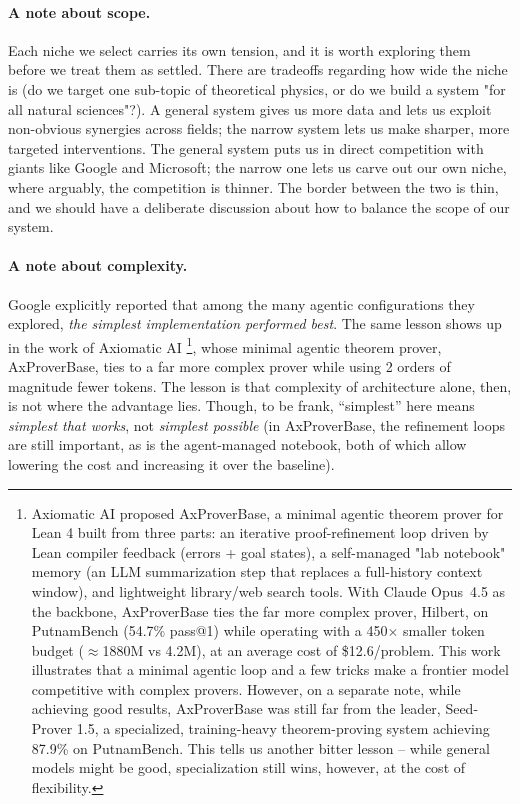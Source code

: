 \paragraph{A note about scope.}
Each niche we select carries its own tension, and it is worth exploring them before we treat them as settled. There are tradeoffs regarding how wide the niche is (do we target one sub-topic of theoretical physics, or do we build a system "for all natural sciences"?). 
A general system gives us more data and lets us exploit non-obvious synergies across fields; the narrow system lets us make sharper, more targeted interventions. The general system puts us in direct competition with giants like Google and Microsoft; the narrow one lets us carve out our own niche, where arguably, the competition is thinner. The border between the two is thin, and we should have a deliberate discussion about how to balance the scope of our system.


\paragraph{A note about complexity.}
Google explicitly reported that among the many agentic configurations they explored, \emph{the simplest implementation performed best}. The same lesson shows up in the work of Axiomatic AI \cite{2602.24273}\footnote{%
    Axiomatic AI proposed AxProverBase, a minimal agentic theorem prover for Lean 4 built from three parts: an iterative proof-refinement loop driven by Lean compiler feedback (errors + goal states), a self-managed "lab notebook" memory (an LLM summarization step that replaces a full-history context window), and lightweight library/web search tools. With Claude Opus~4.5 as the backbone, AxProverBase ties the far more complex prover, Hilbert, on PutnamBench (54.7\% pass@1) while operating with a 450$\times$ smaller token budget ($\approx$1880M vs 4.2M), at an average cost of \$12.6/problem. 
    This work illustrates that a minimal agentic loop and a few tricks make a frontier model competitive with complex provers. However, on a separate note, while achieving good results, AxProverBase was still far from the leader, Seed-Prover 1.5, a specialized, training-heavy theorem-proving system achieving 87.9\% on PutnamBench. This tells us another bitter lesson -- while general models might be good, specialization still wins, however, at the cost of flexibility.
    },
whose minimal agentic theorem prover, AxProverBase, ties to a far more complex prover while using 2 orders of magnitude fewer tokens. The lesson is that complexity of architecture alone, then, is not where the advantage lies. Though, to be frank, ``simplest'' here means \emph{simplest that works}, not \emph{simplest possible} (in AxProverBase, the refinement loops are still important, as is the agent-managed notebook, both of which allow lowering the cost and increasing it over the baseline).

